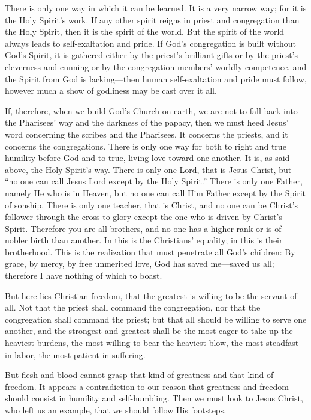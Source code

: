 There is only one way in which it can be learned. It is a very narrow way; for it is the Holy Spirit’s work. If any other spirit reigns in priest and congregation than the Holy Spirit, then it is the spirit of the world. But the spirit of the world always leads to self-exaltation and pride. If God’s congregation is built without God’s Spirit, it is gathered either by the priest’s brilliant gifts or by the priest’s cleverness and cunning or by the congregation members’ worldly competence, and the Spirit from God is lacking—then human self-exaltation and pride must follow, however much a show of godliness may be cast over it all.

If, therefore, when we build God’s Church on earth, we are not to fall back into the Pharisees’ way and the darkness of the papacy, then we must heed Jesus’ word concerning the scribes and the Pharisees. It concerns the priests, and it concerns the congregations. There is only one way for both to right and true humility before God and to true, living love toward one another. It is, as said above, the Holy Spirit’s way. There is only one Lord, that is Jesus Christ, but “no one can call Jesus Lord except by the Holy Spirit.” There is only one Father, namely He who is in Heaven, but no one can call Him Father except by the Spirit of sonship. There is only one teacher, that is Christ, and no one can be Christ’s follower through the cross to glory except the one who is driven by Christ’s Spirit. Therefore you are all brothers, and no one has a higher rank or is of nobler birth than another. In this is the Christians’ equality; in this is their brotherhood. This is the realization that must penetrate all God’s children: By grace, by mercy, by free unmerited love, God has saved me—saved us all; therefore I have nothing of which to boast.

But here lies Christian freedom, that the greatest is willing to be the servant of all. Not that the priest shall command the congregation, nor that the congregation shall command the priest; but that all should be willing to serve one another, and the strongest and greatest shall be the most eager to take up the heaviest burdens, the most willing to bear the heaviest blow, the most steadfast in labor, the most patient in suffering.

But flesh and blood cannot grasp that kind of greatness and that kind of freedom. It appears a contradiction to our reason that greatness and freedom should consist in humility and self-humbling. Then we must look to Jesus Christ, who left us an example, that we should follow His footsteps.

